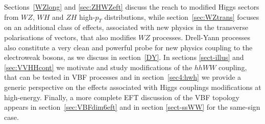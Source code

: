 Sections~\ref{WZlong} and \ref{sec:ZHWZeft} discuss the reach to modified Higgs sectors from $WZ$, $WH$ and $ZH$ high-$p_T$
distributions, while section~\ref{sec:WZtrans} focuses on an additional class of effects, associated with new physics in the transverse polarisations of vectors, that also modifies $WZ$ processes. 
Drell-Yann processes also constitute a very clean and powerful probe for new physics coupling to the electroweak bosons, as we discuss in section~\ref{DY}. In sections \ref{sect-illus} and \ref{sec:VVHHcont} we motivate and study modifications of the $hhWW$ coupling, that can be tested in VBF processes
and in section~\ref{sec4:hwh} we provide a generic perspective on the effects associated with  Higgs couplings modifications at high-energy.
Finally, a more complete EFT discussion of the VBF topology appears in section~\ref{sec:VBFdim6eft} and in section \ref{sect-ssWW} for the same-sign case.












